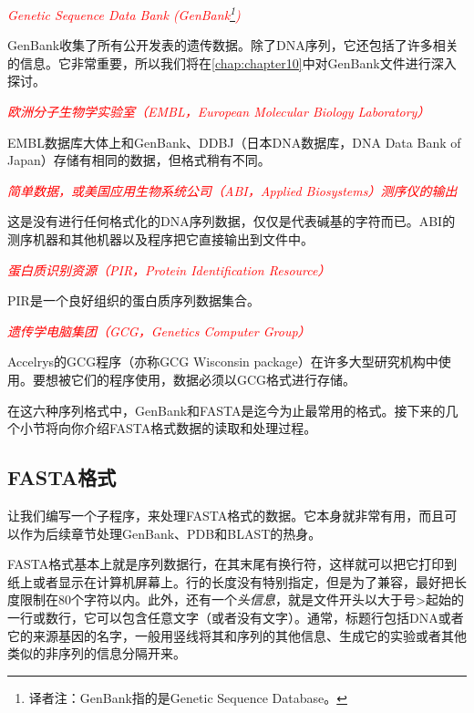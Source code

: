 \textcolor{red}{\textit{Genetic Sequence Data Bank (GenBank\footnote{译者注：GenBank指的是Genetic Sequence Database。})}}
\begin{adjustwidth}{4em}{}
GenBank收集了所有公开发表的遗传数据。除了DNA序列，它还包括了许多相关的信息。它非常重要，所以我们将在\autoref{chap:chapter10}中对GenBank文件进行深入探讨。
\end{adjustwidth}

\textcolor{red}{\textit{欧洲分子生物学实验室（EMBL，European Molecular Biology Laboratory）}}
\begin{adjustwidth}{4em}{}
EMBL数据库大体上和GenBank、DDBJ（日本DNA数据库，DNA Data Bank of Japan）存储有相同的数据，但格式稍有不同。
\end{adjustwidth}

\textcolor{red}{\textit{简单数据，或美国应用生物系统公司（ABI，Applied Biosystems）测序仪的输出}}
\begin{adjustwidth}{4em}{}
这是没有进行任何格式化的DNA序列数据，仅仅是代表碱基的字符而已。ABI的测序机器和其他机器以及程序把它直接输出到文件中。
\end{adjustwidth}

\textcolor{red}{\textit{蛋白质识别资源（PIR，Protein Identification Resource）}}
\begin{adjustwidth}{4em}{}
PIR是一个良好组织的蛋白质序列数据集合。
\end{adjustwidth}

\textcolor{red}{\textit{遗传学电脑集团（GCG，Genetics Computer Group）}}
\begin{adjustwidth}{4em}{}
Accelrys的GCG程序（亦称GCG Wisconsin
package）在许多大型研究机构中使用。要想被它们的程序使用，数据必须以GCG格式进行存储。
\end{adjustwidth}

在这六种序列格式中，GenBank和FASTA是迄今为止最常用的格式。接下来的几个小节将向你介绍FASTA格式数据的读取和处理过程。

\subsection{FASTA格式}
让我们编写一个子程序，来处理FASTA格式的数据。它本身就非常有用，而且可以作为后续章节处理GenBank、PDB和BLAST的热身。

FASTA格式基本上就是序列数据行，在其末尾有换行符，这样就可以把它打印到纸上或者显示在计算机屏幕上。行的长度没有特别指定，但是为了兼容，最好把长度限制在80个字符以内。此外，还有一个\textit{头信息}，就是文件开头以大于号>起始的一行或数行，它可以包含任意文字（或者没有文字）。通常，标题行包括DNA或者它的来源基因的名字，一般用竖线将其和序列的其他信息、生成它的实验或者其他类似的非序列的信息分隔开来。

